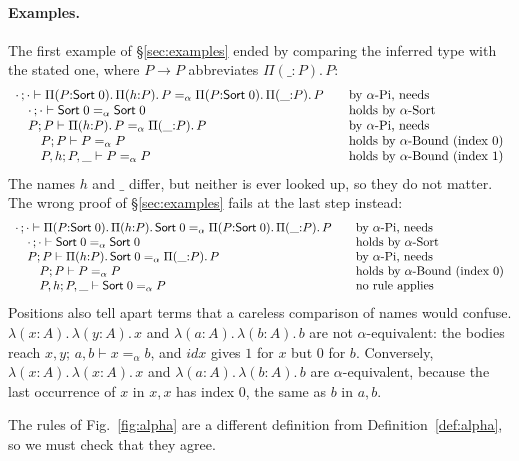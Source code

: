 \documentclass[acmsmall,screen,nonacm]{acmart}
\newcommand{\Sort}[1]{\mathsf{Sort}\;#1}
\newcommand{\tPi}[3]{\Pi(#1{:}#2).\,#3}
\newcommand{\tLam}[3]{\lambda(#1{:}#2).\,#3}
\newcommand{\alphaeq}{=_{\alpha}}
\begin{document}
\paragraph{Examples.}
The first example of \S\ref{sec:examples} ended by comparing the inferred type with the stated one, where $P \to P$ abbreviates $\tPi{\_}{P}{P}$:
\[
\begin{array}{l@{\qquad}l}
\cdot\,;\cdot \vdash \tPi{P}{\Sort{0}}{\tPi{h}{P}{P}} \alphaeq \tPi{P}{\Sort{0}}{\tPi{\_}{P}{P}} & \text{by $\alpha$-Pi, needs} \\
\quad \cdot\,;\cdot \vdash \Sort{0} \alphaeq \Sort{0} & \text{holds by $\alpha$-Sort} \\
\quad P; P \vdash \tPi{h}{P}{P} \alphaeq \tPi{\_}{P}{P} & \text{by $\alpha$-Pi, needs} \\
\quad\quad P; P \vdash P \alphaeq P & \text{holds by $\alpha$-Bound (index $0$)} \\
\quad\quad P, h; P, \_ \vdash P \alphaeq P & \text{holds by $\alpha$-Bound (index $1$)}
\end{array}
\]
The names $h$ and $\_$ differ, but neither is ever looked up, so they do not matter.
The wrong proof of \S\ref{sec:examples} fails at the last step instead:
\[
\begin{array}{l@{\qquad}l}
\cdot\,;\cdot \vdash \tPi{P}{\Sort{0}}{\tPi{h}{P}{\Sort{0}}} \alphaeq \tPi{P}{\Sort{0}}{\tPi{\_}{P}{P}} & \text{by $\alpha$-Pi, needs} \\
\quad \cdot\,;\cdot \vdash \Sort{0} \alphaeq \Sort{0} & \text{holds by $\alpha$-Sort} \\
\quad P; P \vdash \tPi{h}{P}{\Sort{0}} \alphaeq \tPi{\_}{P}{P} & \text{by $\alpha$-Pi, needs} \\
\quad\quad P; P \vdash P \alphaeq P & \text{holds by $\alpha$-Bound (index $0$)} \\
\quad\quad P, h; P, \_ \vdash \Sort{0} \alphaeq P & \text{no rule applies}
\end{array}
\]
Positions also tell apart terms that a careless comparison of names would confuse.
$\tLam{x}{A}{\tLam{y}{A}{x}}$ and $\tLam{a}{A}{\tLam{b}{A}{b}}$ are not $\alpha$-equivalent:
the bodies reach $x, y;\, a, b \vdash x \alphaeq b$, and $\mathit{idx}$ gives $1$ for $x$ but $0$ for $b$.
Conversely, $\tLam{x}{A}{\tLam{x}{A}{x}}$ and $\tLam{a}{A}{\tLam{b}{A}{b}}$ are $\alpha$-equivalent,
because the last occurrence of $x$ in $x, x$ has index $0$, the same as $b$ in $a, b$.

The rules of Fig.~\ref{fig:alpha} are a different definition from Definition~\ref{def:alpha}, so we must check that they agree.
\end{document}
